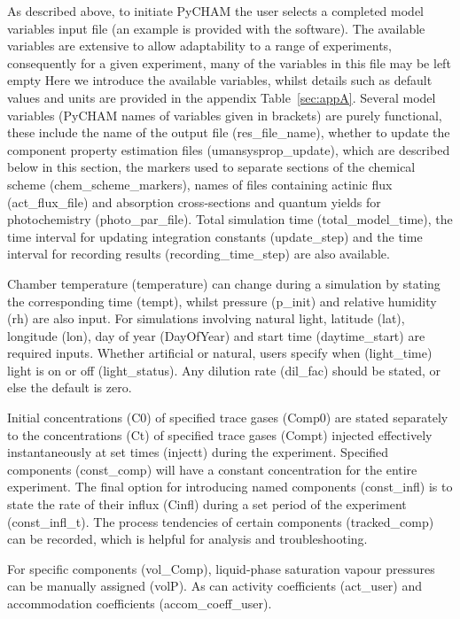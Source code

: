\documentclass[gmd, manuscript]{copernicus}
\begin{document}
As described above, to initiate PyCHAM the user selects a completed model variables input file (an example is provided with the software).  The available variables are extensive to allow adaptability to a range of experiments, consequently for a given experiment, many of the variables in this file may be left empty  Here we introduce the available variables, whilst details such as default values and units are provided in the appendix Table~\ref{sec:appA}.  Several model variables (PyCHAM names of variables given in brackets) are purely functional, these include the name of the output file (res\_file\_name), whether to update the component property estimation files (umansysprop\_update), which are described below in this section, the markers used to separate sections of the chemical scheme (chem\_scheme\_markers), names of files containing actinic flux (act\_flux\_file) and absorption cross-sections and quantum yields for photochemistry (photo\_par\_file).  Total simulation time (total\_model\_time), the time interval for updating integration constants (update\_step) and the time interval for recording results (recording\_time\_step) are also available.

Chamber temperature (temperature) can change during a simulation by stating the corresponding time (tempt), whilst pressure (p\_init) and relative humidity (rh) are also input.  For simulations involving natural light, latitude (lat), longitude (lon), day of year (DayOfYear) and start time (daytime\_start) are required inputs.  Whether artificial or natural, users specify when (light\_time) light is on or off (light\_status).  Any dilution rate (dil\_fac) should be stated, or else the default is zero.

Initial concentrations (C0) of specified trace gases (Comp0) are stated separately to the concentrations (Ct) of specified trace gases (Compt) injected effectively instantaneously at set times (injectt) during the experiment.  Specified components (const\_comp) will have a constant concentration for the entire experiment.  The final option for introducing named components (const\_infl) is to state the rate of their influx (Cinfl) during a set period of the experiment (const\_infl\_t).  The process tendencies of certain components (tracked\_comp) can be recorded, which is helpful for analysis and troubleshooting.

For specific components (vol\_Comp), liquid-phase saturation vapour pressures can be manually assigned (volP).  As can activity coefficients (act\_user) and accommodation coefficients (accom\_coeff\_user).
\end{document}
